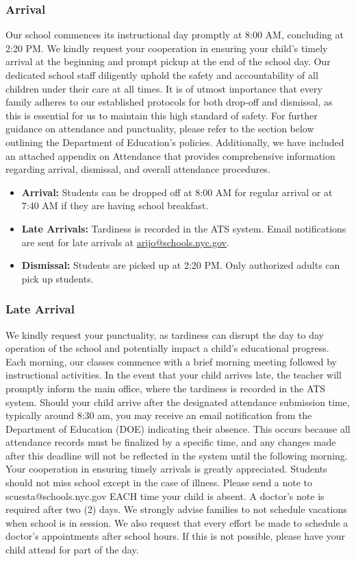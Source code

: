\documentclass[11pt]{article}
\begin{document}
\subsubsection{Arrival}
\label{sec:org5c5f8d9}
Our school commences its instructional day promptly at 8:00 AM, concluding at 2:20 PM. We kindly request your cooperation in ensuring your child’s timely arrival at the beginning and prompt pickup at the end of the school day. Our dedicated school staff diligently uphold the safety and accountability of all children under their care at all times. It is of utmost importance that every family adheres to our established protocols for both drop-off and dismissal, as this is essential for us to maintain this high standard of safety. For further guidance on attendance and punctuality, please refer to the section below outlining the Department of Education’s policies. Additionally, we have included an attached appendix on Attendance that provides comprehensive information regarding arrival, dismissal, and overall attendance procedures.
\begin{itemize}
\item \textbf{\textbf{Arrival:}} Students can be dropped off at 8:00 AM for regular arrival or at 7:40 AM if they are having school breakfast.
\item \textbf{\textbf{Late Arrivals:}} Tardiness is recorded in the ATS system. Email notifications are sent for late arrivals at \href{mailto:arijo@schools.nyc.gov}{arijo@schools.nyc.gov}.
\item \textbf{\textbf{Dismissal:}} Students are picked up at 2:20 PM. Only authorized adults can pick up students.
\end{itemize}

\subsubsection{Late Arrival}
\label{sec:org30cfb38}
We kindly request your punctuality, as tardiness can disrupt the day to day operation of the school and potentially impact a child’s educational progress. Each morning, our classes commence with a brief morning meeting followed by instructional activities. In the event that your child arrives late, the teacher will promptly inform the main office, where the tardiness is recorded in the ATS system. Should your child arrive after the designated attendance submission time, typically around 8:30 am, you may receive an email notification from the Department of Education (DOE) indicating their absence. This occurs because all attendance records must be finalized by a specific time, and any changes made after this deadline will not be reflected in the system until the following morning. Your cooperation in ensuring timely arrivals is greatly appreciated. Students should not miss school except in the case of illness. Please send a note to scuesta@schools.nyc.gov EACH time your child is absent. A doctor’s note is required after two (2) days. We strongly advise families to not schedule vacations when school is in session. We also request that every effort be made to schedule a doctor’s appointments after school hours. If this is not possible, please have your child attend for part of the day.
\end{document}
